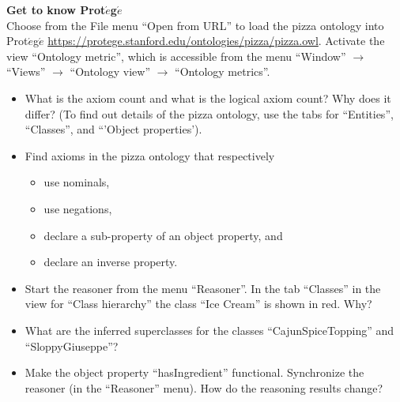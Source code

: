 \documentclass[12pt,a4paper]{article}
\newenvironment{problem}[2][{\color{red}Question}]{\begin{trivlist}
\item[\hskip \labelsep {\bfseries #1}\hskip \labelsep {\bfseries #2.}]}{\end{trivlist}}
\begin{document}
\begin{problem}{{\color{red}9}}
\textbf{Get to know Prot$\acute{e}$g$\acute{e}$}\\
Choose from the File menu ``Open from URL'' to load the pizza ontology into Prot$\acute{e}$g$\acute{e}$ \url{https://protege.stanford.edu/ontologies/pizza/pizza.owl}. Activate the view ``Ontology metric'', which is accessible from the menu ``Window'' $\rightarrow$ ``Views'' $\rightarrow$ ``Ontology view'' $\rightarrow$ ``Ontology metrics''.
\begin{itemize}
    \item What is the axiom count and what is the logical axiom count? Why does it differ? (To find out details of the pizza ontology, use the tabs for ``Entities'', ``Classes'', and ``'Object properties').
    \item Find axioms in the pizza ontology that respectively
    \begin{itemize}
        \item use nominals,
        \item use negations,
        \item declare a sub-property of an object property, and
        \item declare an inverse property.
    \end{itemize}
    \item Start the reasoner from the menu ``Reasoner''. In the tab ``Classes'' in the view for ``Class hierarchy'' the class ``Ice Cream'' is shown in red. Why?
    \item What are the inferred superclasses for the classes ``CajunSpiceTopping'' and ``SloppyGiuseppe''?
    \item Make the object property ``hasIngredient'' functional. Synchronize the reasoner (in the ``Reasoner'' menu). How do the reasoning results change? 
\end{itemize}
\end{problem}
\end{document}
